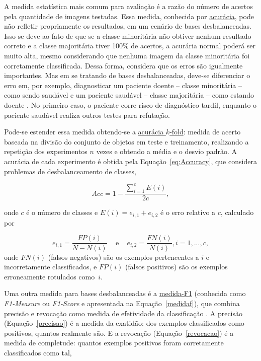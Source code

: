 A medida estatística mais comum para avaliação é a razão do número de acertos pela quantidade de imagens testadas. Essa medida, conhecida por \underline{acurácia}, pode não refletir propriamente os resultados, em um cenário de bases desbalanceadas. Isso se deve ao fato de que se a classe minoritária não obtiver nenhum resultado correto e a classe majoritária tiver 100\% de acertos, a acurária normal poderá ser muito alta, mesmo considerando que nenhuma imagem da classe minoritária foi corretamente classificada. Dessa forma, considera que os erros são igualmente importantes. Mas em se tratando de bases desbalanceadas, deve-se diferenciar o erro em, por exemplo, diagnosticar um paciente doente -- classe minoritária -- como sendo saudável e um paciente saudável -- classe majoritária -- como estando doente \cite{Batista2004}. No primeiro caso, o paciente corre risco de diagnóstico tardil, enquanto o paciente saudável realiza outros testes para refutação.

Pode-se estender essa medida obtendo-se a \underline{acurácia $k$-fold}: medida de acerto baseada na divisão do conjunto de objetos em teste e treinamento, realizando a repetição dos experimentos $n$ vezes e obtendo a média e o desvio padrão. A acurácia de cada experimento é obtida pela Equação~\ref{eq:Accuracy}, que considera problemas de desbalanceamento de classes,

    \begin{equation}
      Acc = 1 - \frac{\sum_{i=1}^{c} E(i)}{2c},
    \label{eq:Accuracy}
    \end{equation}

    \noindent onde $c$ é o número de classes e $E(i) = e_{i,1} + e_{i,2}$ é o erro relativo a $c$, calculado por

    \begin{equation*}
      e_{i,1} = \frac{FP(i)}{N-N(i)} \,\,\,\,\, \text{ e } \,\,\,\,\, e_{i,2} = \frac{FN(i)}{N(i)}, i=1,...,c,
    \label{eq:Errors}
    \end{equation*}
   \noindent onde $FN(i)$ (falsos negativos) são os exemplos pertencentes a $i$ e incorretamente classificados, e $FP(i)$ (falsos positivos) são os exemplos erroneamente rotulados como~$i$.


Uma outra medida para bases desbalanceadas é a \underline{medida-F1} (conhecida como \textit{F1-Measure} ou \textit{F1-Score} e apresentada na Equação~\ref{medidaf}), que combina precisão e revocação como medida de efetividade da classificação \cite{Garcia2009}.
A precisão (Equação~\ref{precisao}) é a medida da exatidão: dos exemplos classificados como positivos, quantos realmente são. E a revocação (Equação~\ref{revocacao}) é a medida de completude: quantos exemplos positivos foram corretamente classificados como tal,

